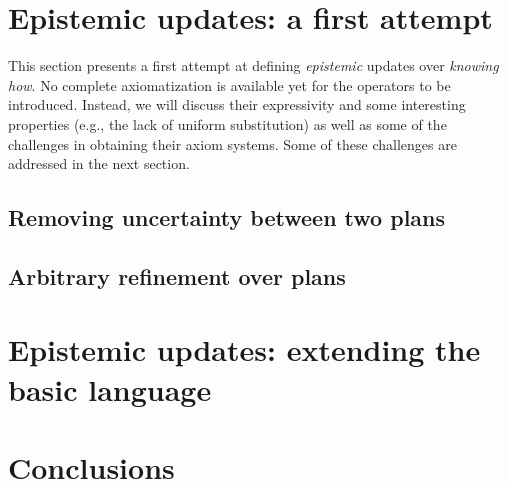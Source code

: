 \documentclass[sn-mathphys-num]{sn-jnl}%
\begin{document}
\section{Epistemic updates: a first attempt}
\label{sec:epistemic-basic} 

This section presents a first attempt at defining \emph{epistemic} updates over \emph{knowing how}. No complete axiomatization is available yet for the operators to be introduced. Instead, we will discuss their expressivity and some interesting properties (e.g., the lack of uniform substitution) as well as some of the challenges in obtaining their axiom systems. Some of these challenges are addressed in the next section.

\subsection{Removing uncertainty between two plans}
\label{sec:ref}


\subsection{Arbitrary refinement over plans}
\label{sec:aref}


% 

\section{Epistemic updates: extending the basic language}
\label{sec:extension}









% 



% 

\section{Conclusions}
\label{sec:final}


% 


% 
\end{document}
